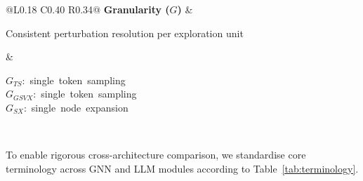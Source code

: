 \documentclass[review,12pt]{elsarticle}
\newcommand{\nowrap}[1]{\mbox{#1}}
\begin{document}
\begin{table}[H]
\begin{tabular}{@{}L{0.18\textwidth} C{0.40\textwidth} R{0.34\textwidth}@{}}
\textbf{Granularity ($G$)} &
\begin{minipage}[c]{0.40\textwidth}\centering
Consistent perturbation resolution per exploration unit
\end{minipage} &
\begin{minipage}[c]{0.34\textwidth}\centering
\nowrap{$G_{TS}$: single token sampling}\\
\nowrap{$G_{GSVX}$: single token sampling}\\
\nowrap{$G_{SX}$: single node expansion}
\end{minipage}\\[0.6em]
\bottomrule
\end{tabular}

\caption{Fair comparison dimensions across explainability modules. All explainer configurations share equivalent evaluation depth and perturbation resolution to isolate differences in algorithmic behaviour.}
\label{tab:fairness}
\end{table}


To enable rigorous cross-architecture comparison, we standardise core terminology across GNN and LLM modules according to Table~\ref{tab:terminology}.
\end{document}
